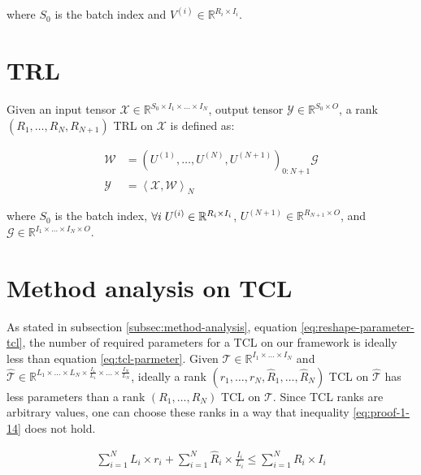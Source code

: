 \documentclass{article}
\begin{document}
where $S_0$ is the batch index and $V^{(i)} \in \mathbb{R}^{R_i\times I_i}$.

\section{TRL}
\label{A-trl}
Given an input tensor $\mathcal{X} \in \mathbb{R}^{S_0\times I_1\times\dots\times I_N}$, output tensor $\mathcal{Y} \in \mathbb{R}^{S_0\times O}$, a rank $(R_1,\dots,R_N, R_{N+1})$ TRL on $\mathcal{X}$  is defined as:

\begin{align}
	\label{eq:trl}
	\mathcal{W} &= \left(U^{(1)},\dots,U^{(N)}, U^{(N+1)}\right)_{0:N+1} \mathcal{G}
	\nonumber\\
	\mathcal{Y} &=  \left\langle \mathcal{X}, \mathcal{W}\right\rangle_N
\end{align}

where $S_0$ is the batch index, $\forall i \hspace{1mm}U^{(i)} \in \mathbb{R}^{R_i\times I_i}$,
$U^{(N+1)} \in \mathbb{R}^{R_{N+1}\times O}$,
and $\mathcal{G} \in \mathbb{R}^{I_1\times\dots\times I_N\times O}$.

\section{Method analysis on TCL}
\label{proof-1}
As stated in subsection \ref{subsec:method-analysis}, 
equation \ref{eq:reshape-parameter-tcl}, the number of required parameters for a TCL on our framework is ideally less than equation \ref{eq:tcl-parmeter}. Given $\mathcal{T} \in \mathbb{R}^{I_1\times\dots\times I_N}$ and $\hat{\mathcal{T}} \in \mathbb{R}^{L_1\times\dots\times L_N\times \frac{I_1}{L_1}\times\dots\times\frac{I_N}{L_N}}$, ideally a rank $(r_1,\dots,r_N, \hat{R}_1, \dots, \hat{R}_N)$ TCL on $\hat{\mathcal{T}}$ has less parameters than a rank $(R_1,\dots,R_N)$ TCL on $\mathcal{T}$. Since TCL ranks are arbitrary values, one can choose these ranks in a way that inequality \ref{eq:proof-1-14} does not hold.

\begin{align}
	\label{eq:proof-1-14}
	\sum_{i=1}^{N}L_i\times r_i + \sum_{i=1}^{N} \hat{R}_i \times \frac{I_i}{L_i} \leq
	\sum_{i=1}^{N}R_i\times I_i
\end{align}
\end{document}
